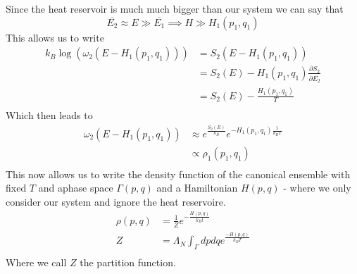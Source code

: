\documentclass{report}
\begin{document}
Since the heat reservoir is much much bigger than our system we can say that  \[
  \overline{E_2} \approx E \gg \overline{E_1} \implies H \gg H_1\left( p_1,q_1 \right) 
\] This allows us to write 
\begin{align*}
  k_B \log\left( \omega_2\left( E - H_1\left( p_1,q_1 \right)  \right)  \right) &= S_2\left( E - H_1\left( p_1,q_1 \right)  \right) \\
                                                                                &= S_2\left( E \right) - H_1\left( p_1,q_1 \right) \frac{\partial S_2 }{\partial \overline{E_2}} \\
                                                                                &= S_2\left( E \right) - \frac{H_1\left( p_1,q_1 \right) }{T} \\
\end{align*}
Which then leads to 
\begin{align*}
  \omega_2\left( E-H_1\left( p_1,q_1 \right)  \right) &\approx e^{\frac{S_2\left( E \right) }{k_B}} e^{-H_1\left( p_1,q_1 \right) \frac{1}{k_B T}} \\
                                                      &\propto \rho_1\left( p_1,q_1 \right)  \\
\end{align*}
This now allows us to write the density function of the canonical ensemble with fixed $T$ and aphase space $\Gamma\left( p,q \right) $  and a Hamiltonian $H\left( p,q \right) $ - where we only consider our system and ignore the heat reservoire. 
\begin{align*}
  \rho\left( p,q \right) &= \frac{1}{Z} e^{-\frac{H\left( p,q \right) }{k_B t} } \\
  Z &=  \Lambda_N \int_\Gamma dp dq e^{\frac{-H\left( p,q \right) }{k_B T}} \\
\end{align*}
Where we call $Z$ the partition function.
\end{document}
